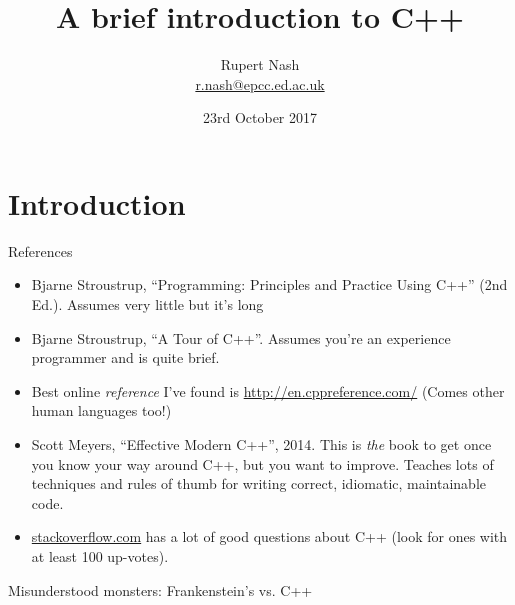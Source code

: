 \documentclass[presentation,t]{beamer}
\author{Rupert Nash\\ \url{r.nash@epcc.ed.ac.uk}}
\date{23rd October 2017}
\title{A brief introduction to C++}
\begin{document}
\frame{\titlepage}
\section{Introduction}

\begin{frame}{References}
  \begin{itemize}
  \item Bjarne Stroustrup, ``Programming: Principles and Practice
    Using C++'' (2nd Ed.). Assumes very little but it's long
  \item Bjarne Stroustrup, ``A Tour of C++''. Assumes you're an
    experience programmer and is quite brief.
  \item Best online \emph{reference} I've found is
    \url{http://en.cppreference.com/} (Comes other human languages
    too!)
  \item Scott Meyers, ``Effective Modern C++'', 2014. This is
    \emph{the} book to get once you know your way around C++, but you
    want to improve. Teaches lots of techniques and rules of thumb for
    writing correct, idiomatic, maintainable code.
  \item \url{stackoverflow.com} has a lot of good questions about C++
    (look for ones with at least 100 up-votes).
  \end{itemize}
\end{frame}

  \begin{frame}{Misunderstood monsters: Frankenstein's vs. C++}
\end{frame}
\end{document}
